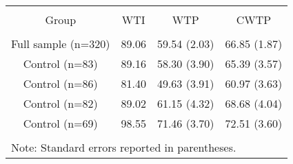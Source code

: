 
\begin{table}[!htbp] \centering 
  \caption{} 
  \label{} 
\begin{tabular}{@{\extracolsep{5pt}} cccc} 
\\[-1.8ex]\hline 
\hline \\[-1.8ex] 
Group & WTI & WTP & CWTP \\ 
\hline \\[-1.8ex] 
Full sample (n=320) & 89.06 & 59.54 (2.03) & 66.85 (1.87) \\ 
Control (n=83) & 89.16 & 58.30 (3.90) & 65.39 (3.57) \\ 
Control (n=86) & 81.40 & 49.63 (3.91) & 60.97 (3.63) \\ 
Control (n=82) & 89.02 & 61.15 (4.32) & 68.68 (4.04) \\ 
Control (n=69) & 98.55 & 71.46 (3.70) & 72.51 (3.60) \\ 
\hline \\[-1.8ex] 
\multicolumn{4}{l}{Note: Standard errors reported in parentheses.} \\ 
\end{tabular} 
\end{table} 
